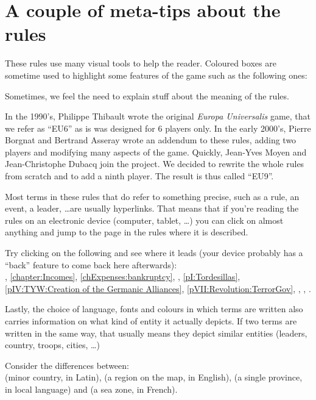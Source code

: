 \section*{A couple of meta-tips about the rules}
These rules use many visual tools to help the reader. Coloured boxes are
sometime used to highlight some features of the game such as the following
ones:
\begin{designnote}
  Sometimes, we feel the need to explain stuff about the meaning of the rules.
\end{designnote}
\begin{histoire}
  In the 1990's, Philippe Thibault wrote the original \emph{Europa
    Universalis} game, that we refer as ``EU6'' as is was designed for 6
  players only. In the early 2000's, Pierre Borgnat and Bertrand Asseray wrote
  an addendum to these rules, adding two players and modifying many aspects of
  the game. Quickly, Jean-Yves Moyen and Jean-Christophe Dubacq join the
  project. We decided to rewrite the whole rules from scratch and to add a
  ninth player. The result is thus called ``EU9''.
\end{histoire}

Most terms in these rules that do refer to something precise, such as a rule,
an event, a leader, \ldots are usually hyperlinks. That means that if you're
reading the rules on an electronic device (computer, tablet, \ldots) you can
click on almost anything and jump to the page in the rules where it is
described.
\begin{exemple}
  Try clicking on the following and see where it leads (your device probably
  has a ``back'' feature to come back here afterwards):\\
  \ANG, \ref{chapter:Incomes}, \ref{chExpenses:bankruptcy}, \continentBrazil,
  \ref{pI:Tordesillas}, \ref{pIV:TYW:Creation of the Germanic Alliances},
  \ref{pVII:Revolution:TerrorGov}, \monarqueSuleyman, \ministreRichelieu,
  .
\end{exemple}

Lastly, the choice of language, fonts and colours in which terms are written
also carries information on what kind of entity it actually depicts. If two
terms are written in the same way, that usually means they depict similar
entities (leaders, country, troops, cities, \ldots)
\begin{exemple}
  Consider the differences between:\\
  \paysVnorvege (minor country, in Latin), \regionNorvege (a region on the
  map, in English), \provinceNorvege (a single province, in local language)
  and \seazoneNorvege (a sea zone, in French).
\end{exemple}

